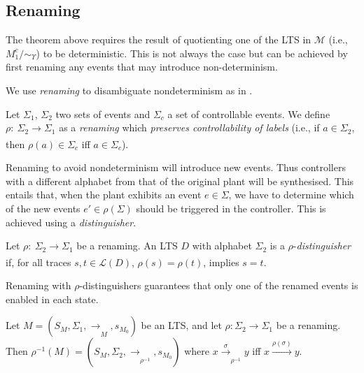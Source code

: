 
\subsection{Renaming}
\label{subsection:renaming}
The theorem above requires the result of quotienting one of the LTS in $\mathcal{M}$ (i.e., $M_{1}^{c} \slash \! \sim_\Upsilon$) to be deterministic. This is not always the case but can be achieved by first renaming any events that may introduce non-determinism.

We use \textit{renaming} to disambiguate nondeterminism as in \cite{wong1989computation}. 

\begin{definition}[Renaming]
Let $\Sigma_1$, $\Sigma_2$ two sets of events and $\Sigma_c$ a set of controllable events. We define $\rho: \ \Sigma_2 \xrightarrow[]{} \Sigma_1$ as a \textit{renaming} which \textit{preserves controllability of labels} (i.e., if $a \in \Sigma_2$, then $\rho(a) \in \Sigma_c$  iff $a \in \Sigma_c$).
\end{definition} 

Renaming to avoid nondeterminism will introduce new events. Thus controllers with a different alphabet from that of the original plant will be synthesised. This entails that, when the plant exhibits an event $e \in \Sigma$, we have to determine which of the new events $e' \in \rho(\Sigma)$ should be triggered in the controller. This is achieved using a \textit{distinguisher}\cite{mohajerani_framework_2014}.

\begin{definition}
Let $\rho: \ \Sigma_2 \xrightarrow[]{} \Sigma_1$ be a renaming. An LTS $D$ with alphabet $\Sigma_2$ is a $\rho$-\textit{distinguisher} if, for all traces $s, t \in \mathcal{L}(D)$,  $\rho(s) = \rho(t)$, implies $s = t$.
\end{definition}

Renaming with $\rho$-distinguishers  guarantees that only one of the renamed events is enabled in each state. 


\begin{definition}\cite{mohajerani_framework_2014}
\label{def:reverse_renaming}
Let $M = (S_{M}, \Sigma_1, \xrightarrow[]{}_M, s_{M_0})$ be an LTS, and let $\rho: \Sigma_2 \xrightarrow{} \Sigma_1$ be a renaming. Then $\rho^{-1}(M) = (S_M, \Sigma_2, \xrightarrow[]{}_{\rho^{-1}}, s_{M_0})$ where $x \xrightarrow[]{\sigma}_{\rho^{-1}} y$ iff $x \xrightarrow[]{\rho(\sigma)} y$.

\end{definition}


